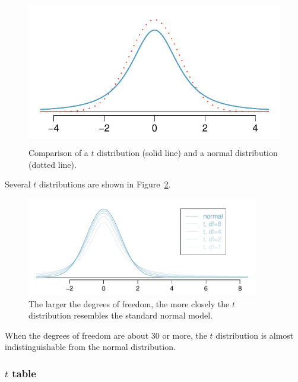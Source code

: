 \begin{figure}[H]
\centering
\includegraphics[height=65mm]{05/figures/tDistCompareToNormalDist/tDistCompareToNormalDist}
\caption{Comparison of a $t$ distribution (solid line) and a normal distribution (dotted line).}
\label{tDistCompareToNormalDist}
\end{figure}


Several $t$ distributions are shown in Figure~\ref{tDistConvergeToNormalDist}. 

\begin{figure}[H]
\centering
\includegraphics[width=0.9\textwidth]{05/figures/tDistConvergeToNormalDist/tDistConvergeToNormalDist}
\caption{The larger the degrees of freedom, the more closely the $t$ distribution resembles the standard normal model.}
\label{tDistConvergeToNormalDist}
\end{figure}



When the degrees of freedom are about 30 or more, the $t$ distribution is almost indistinguishable from the normal distribution. 
{ }

\subsubsection{$t$ table}
\label{sectiontTable}

